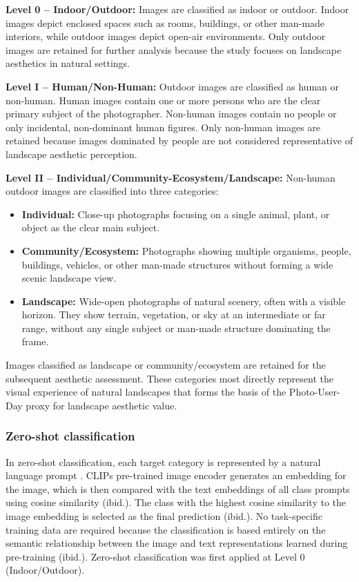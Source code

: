 \documentclass[11pt]{article}
\renewcommand{\_}{\textunderscore\allowbreak{}}
\begin{document}
\textbf{Level 0 -- Indoor/Outdoor:} Images are classified as indoor or outdoor. Indoor images depict enclosed spaces such as rooms, buildings, or other man-made interiors, while outdoor images depict open-air environments. Only outdoor images are retained for further analysis because the study focuses on landscape aesthetics in natural settings.

\textbf{Level I -- Human/Non-Human:} Outdoor images are classified as human or non-human. Human images contain one or more persons who are the clear primary subject of the photographer. Non-human images contain no people or only incidental, non-dominant human figures. Only non-human images are retained because images dominated by people are not considered representative of landscape aesthetic perception.

\textbf{Level II -- Individual/Community-Ecosystem/Landscape:} Non-human outdoor images are classified into three categories:
\begin{itemize}
\item \textbf{Individual:} Close-up photographs focusing on a single animal, plant, or object as the clear main subject.
\item \textbf{Community/Ecosystem:} Photographs showing multiple organisms, people, buildings, vehicles, or other man-made structures without forming a wide scenic landscape view.
\item \textbf{Landscape:} Wide-open photographs of natural scenery, often with a visible horizon. They show terrain, vegetation, or sky at an intermediate or far range, without any single subject or man-made structure dominating the frame.
\end{itemize}

Images classified as landscape or community/ecosystem are retained for the subsequent aesthetic assessment. These categories most directly represent the visual experience of natural landscapes that forms the basis of the Photo-User-Day proxy for landscape aesthetic value.

\subsubsection{Zero-shot classification}

In zero-shot classification, each target category is represented by a natural language prompt \citep{radford_learning_2021}. CLIPs pre-trained image encoder generates an embedding for the image, which is then compared with the text embeddings of all class prompts using cosine similarity (ibid.). The class with the highest cosine similarity to the image embedding is selected as the final prediction (ibid.). No task-specific training data are required because the classification is based entirely on the semantic relationship between the image and text representations learned during pre-training (ibid.). Zero-shot classification was first applied at Level 0 (Indoor/Outdoor).
\end{document}
